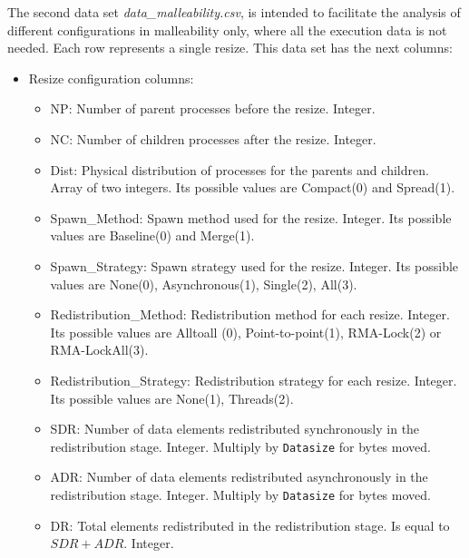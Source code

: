 The second data set \textit{data\_malleability.csv}, is intended to facilitate the analysis of different configurations in malleability only, where all the execution data is not needed. Each row represents a single resize.
This data set has the next columns:
\begin{itemize}
    \item Resize configuration columns:
    \begin{itemize}
        \item NP: Number of parent processes before the resize. Integer.
        \item NC: Number of children processes after the resize. Integer.
        \item Dist: Physical distribution of processes for the parents and children. Array of two integers. Its possible values are Compact(0) and Spread(1).
        \item Spawn\_Method: Spawn method used for the resize. Integer. Its possible values are Baseline(0) and Merge(1).
        \item Spawn\_Strategy: Spawn strategy used for the resize. Integer. Its possible values are None(0), Asynchronous(1), Single(2), All(3).
        \item Redistribution\_Method: Redistribution method for each resize. Integer. Its possible values are Alltoall (0), Point-to-point(1), RMA-Lock(2) or RMA-LockAll(3).
        \item Redistribution\_Strategy: Redistribution strategy for each resize. Integer. Its possible values are None(1), Threads(2).
        \item SDR: Number of data elements redistributed synchronously in the redistribution stage. Integer. Multiply by \texttt{Datasize} for bytes moved.
        \item ADR: Number of data elements redistributed asynchronously in the redistribution stage. Integer. Multiply by \texttt{Datasize} for bytes moved.
        \item DR: Total elements redistributed in the redistribution stage. Is equal to $SDR + ADR$. Integer.
    \end{itemize}
    

\end{itemize}

